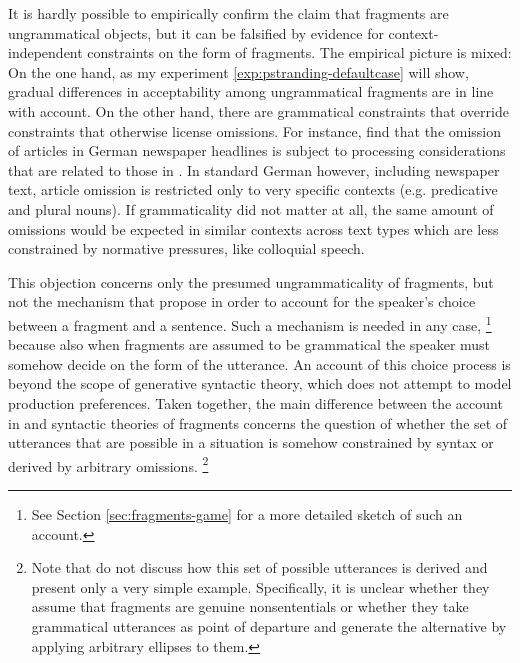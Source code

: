 It is hardly possible to empirically confirm the claim that fragments are ungrammatical objects, but it can be falsified by evidence for context-independent constraints on the form of fragments. The empirical picture is mixed: On the one hand, as my experiment \ref{exp:pstranding-defaultcase} will show, gradual differences in acceptability among ungrammatical fragments are in line with  account. On the other hand, there are grammatical constraints that override constraints that otherwise license omissions. For instance, \citet{lemke.etal2017} find that the omission of articles in German newspaper headlines is subject to processing considerations that are related to those in \citet{bergen.goodman2015}. In standard German however, including newspaper text, article omission is restricted only to very specific contexts (e.g. predicative and plural nouns). If grammaticality did not matter at all, the same amount of omissions would be expected in similar contexts across text types which are less constrained by normative pressures, like colloquial speech.

This objection concerns only the presumed ungrammaticality of fragments, but not the mechanism that \citet{bergen.goodman2015} propose in order to account for the speaker's choice between a fragment and a sentence. Such a mechanism is needed in any case,%
%
\footnote{See Section \ref{sec:fragments-game} for a more detailed sketch of such an account.}\afterfn%
%
because also when fragments are assumed to be grammatical the speaker must somehow decide on the form of the utterance. An account of this choice process is beyond the scope of generative syntactic theory, which does not attempt to model production preferences. Taken together, the main difference between the account in \citet{bergen.goodman2015} and syntactic theories of fragments concerns the question of whether the set of utterances that are possible in a situation is somehow constrained by syntax or derived by arbitrary omissions.%
%
\footnote{Note that \citet{bergen.goodman2015} do not discuss how this set of possible utterances is derived and present only a very simple example. Specifically, it is unclear whether they assume that fragments are genuine nonsententials or whether they take grammatical utterances as point of departure and generate the alternative by applying arbitrary ellipses to them.}\afterfn%
%


